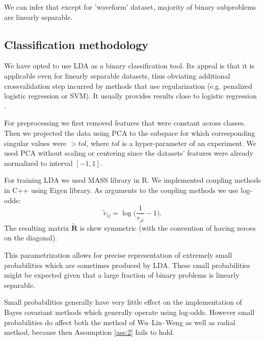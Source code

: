 

We can infer that except for 'waveform' dataset, majority of binary subproblems are linearly separable.

\subsection{Classification methodology}

We have opted to use LDA as a binary classification tool. Its appeal is that it is applicable even for linearly separable datasets, thus obviating additional crossvalidation step incurred by methods that use regularization (e.g. penalized logistic regression or SVM). It usually provides results close to logistic regression \cite{james2013introduction}.

For preprocessing we first removed features that were constant across classes. Then we projected the data using PCA to the subspace for which corresponding singular values were $> tol$, where $tol$ is a hyper-parameter of an experiment. We used PCA without scaling or centering since the datasets' features were already normalized to interval $[-1,1]$. 

For training LDA we used MASS library in R. We implemented coupling methods in C++ using Eigen library. As arguments to the coupling methods we use log-odds:
$$
\tilde r_{ij} = \log \biggl(\frac{1}{r_{ji}} - 1\biggr).
$$
The resulting matrix $\tilde{\boldsymbol{R}}$ is skew symmetric (with the convention of having zeroes on the diagonal).

This parametrization allows for precise representation of extremely small probabilities which are sometimes produced by LDA. These small probabilities might be expected given that a large fraction of binary problems is linearly separable. 

Small probabilities generally have very little effect on the implementation of Bayes covariant methods which generally operate using log-odds. However small probabilities do affect both the method of Wu--Lin--Weng as well as radial method, because then Assumption \ref{ass:2} fails to hold. 



